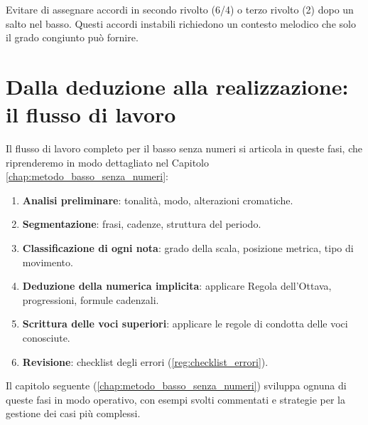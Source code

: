 \begin{errore}
	\label{err:rivoltato_dopo_salto}
	Evitare di assegnare accordi in secondo rivolto (6/4) o terzo rivolto (2) dopo un salto nel basso. Questi accordi instabili richiedono un contesto melodico che solo il grado congiunto può fornire.
\end{errore}

\section{Dalla deduzione alla realizzazione: il flusso di lavoro}
\label{sec:flusso_lavoro_basso_senza_numeri}

Il flusso di lavoro completo per il basso senza numeri si articola in queste fasi, che riprenderemo in modo dettagliato nel Capitolo \ref{chap:metodo_basso_senza_numeri}:

\begin{enumerate}
	\item \textbf{Analisi preliminare}: tonalità, modo, alterazioni cromatiche.
	\item \textbf{Segmentazione}: frasi, cadenze, struttura del periodo.
	\item \textbf{Classificazione di ogni nota}: grado della scala, posizione metrica, tipo di movimento.
	\item \textbf{Deduzione della numerica implicita}: applicare Regola dell'Ottava, progressioni, formule cadenzali.
	\item \textbf{Scrittura delle voci superiori}: applicare le regole di condotta delle voci conosciute.
	\item \textbf{Revisione}: checklist degli errori (\ref{reg:checklist_errori}).
\end{enumerate}

Il capitolo seguente (\ref{chap:metodo_basso_senza_numeri}) sviluppa ognuna di queste fasi in modo operativo, con esempi svolti commentati e strategie per la gestione dei casi più complessi.
